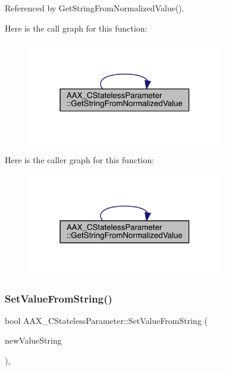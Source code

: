 Referenced by Get\+String\+From\+Normalized\+Value().

Here is the call graph for this function\+:
\nopagebreak
\begin{figure}[H]
\begin{center}
\leavevmode
\includegraphics[width=243pt]{a01541_a8d9c9e41b267a58234ad49e136f913b1_cgraph}
\end{center}
\end{figure}
Here is the caller graph for this function\+:
\nopagebreak
\begin{figure}[H]
\begin{center}
\leavevmode
\includegraphics[width=243pt]{a01541_a8d9c9e41b267a58234ad49e136f913b1_icgraph}
\end{center}
\end{figure}
\mbox{\label{a01541_aac043ee3e4813c57b864c07ca60de2c9}} 
\subsubsection{\texorpdfstring{SetValueFromString()}{SetValueFromString()}}
{\footnotesize\ttfamily bool A\+A\+X\+\_\+\+C\+Stateless\+Parameter\+::\+Set\+Value\+From\+String (\begin{DoxyParamCaption}\item[{const \mbox{\hyperlink{a01573}{A\+A\+X\+\_\+\+C\+String}} \&}]{new\+Value\+String }\end{DoxyParamCaption})\hspace{0.3cm}{\ttfamily [inline]}, {\ttfamily [virtual]}}



